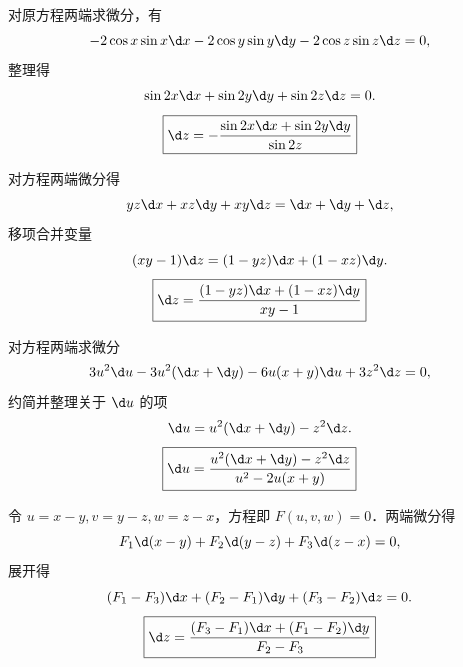\begin{solution}

    对原方程两端求微分，有
    \begin{equation}
        -2\cos x \sin x \d x - 2\cos y \sin y \d y - 2\cos z \sin z \d z = 0,
    \end{equation}
    整理得
    \begin{equation}
        \sin 2x \d x + \sin 2y \d y + \sin 2z \d z = 0.
    \end{equation}
    \begin{equation}
        \boxed{\d z = - \frac{\sin 2x \d x + \sin 2y \d y}{\sin 2z}}
    \end{equation}


    对方程两端微分得
    \begin{equation}
        yz \d x + xz \d y + xy \d z = \d x + \d y + \d z,
    \end{equation}
    移项合并变量
    \begin{equation}
        (xy - 1) \d z = (1 - yz) \d x + (1 - xz) \d y.
    \end{equation}
    \begin{equation}
        \boxed{\d z = \frac{(1 - yz) \d x + (1 - xz) \d y}{xy - 1}}
    \end{equation}


    对方程两端求微分
    \begin{equation}
        3u^2 \d u - 3u^2 (\d x + \d y) - 6u(x + y) \d u + 3z^2 \d z = 0,
    \end{equation}
    约简并整理关于 $\d u$ 的项
    \begin{equation}
        [u^2 - 2u(x + y)] \d u = u^2(\d x + \d y) - z^2 \d z.
    \end{equation}
    \begin{equation}
        \boxed{\d u = \frac{u^2(\d x + \d y) - z^2 \d z}{u^2 - 2u(x + y)}}
    \end{equation}


    令 $u = x - y, v = y - z, w = z - x$，方程即 $F(u, v, w) = 0$．两端微分得
    \begin{equation}
        F_1 \d (x - y) + F_2 \d (y - z) + F_3 \d (z - x) = 0,
    \end{equation}
    展开得
    \begin{equation}
        (F_1 - F_3) \d x + (F_2 - F_1) \d y + (F_3 - F_2) \d z = 0.
    \end{equation}
    \begin{equation}
        \boxed{\d z = \frac{(F_3 - F_1) \d x + (F_1 - F_2) \d y}{F_2 - F_3}}
    \end{equation}
\end{solution}


